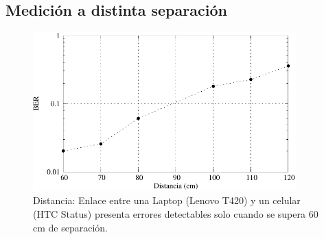 %

\subsection{Medición a distinta separación}

\begin{figure}[t]
  \centering
    \includegraphics[width=4in]{graphs/mediciones-distancia-fig7.pdf}
\caption {Distancia: Enlace entre una Laptop (Lenovo T420) y un celular (HTC Status) presenta errores detectables solo cuando se supera 60 cm de separación.}
\label{fig:acudist}
\end{figure}

